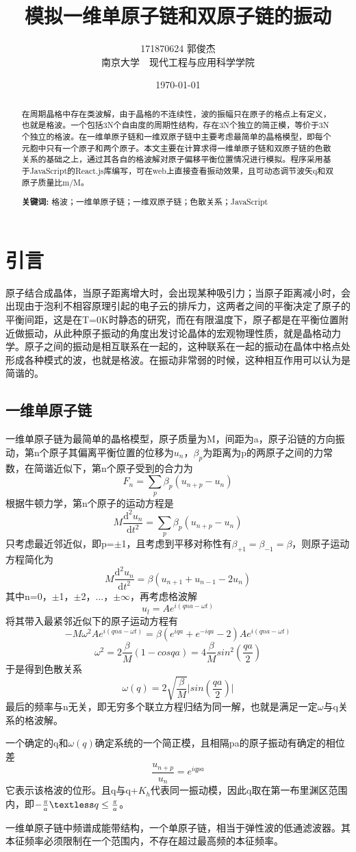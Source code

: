 \documentclass[UTF8]{article}
\title{模拟一维单原子链和双原子链的振动}   %
\author{171870624 郭俊杰\\南京大学$\quad$现代工程与应用科学学院}   %
\date{\today}    %
\begin{document}
\maketitle

\begin{abstract}
在周期晶格中存在类波解，由于晶格的不连续性，波的振幅只在原子的格点上有定义，也就是格波。一个包括3N个自由度的周期性结构，存在3N个独立的简正模，等价于3N个独立的格波。在一维单原子链和一维双原子链中主要考虑最简单的晶格模型，即每个元胞中只有一个原子和两个原子。本文主要在计算求得一维单原子链和双原子链的色散关系的基础之上，通过其各自的格波解对原子偏移平衡位置情况进行模拟。程序采用基于JavaScript的React.js库编写，可在web上直接查看振动效果，且可动态调节波矢q和双原子质量比m/M。 \\
\par\textbf{关键词: } 格波；一维单原子链；一维双原子链；色散关系；JavaScript
\end{abstract}


\section{引言}
原子结合成晶体，当原子距离增大时，会出现某种吸引力；当原子距离减小时，会出现由于泡利不相容原理引起的电子云的排斥力，这两者之间的平衡决定了原子的平衡间距，这是在T=0K时静态的研究，而在有限温度下，原子都是在平衡位置附近做振动，从此种原子振动的角度出发讨论晶体的宏观物理性质，就是晶格动力学。原子之间的振动是相互联系在一起的，这种联系在一起的振动在晶体中格点处形成各种模式的波，也就是格波。在振动非常弱的时候，这种相互作用可以认为是简谐的。

\subsection{一维单原子链}
一维单原子链为最简单的晶格模型，原子质量为M，间距为a，原子沿链的方向振动，第n个原子其偏离平衡位置的位移为$u_n$，$\beta_p$为距离为p的两原子之间的力常数，在简谐近似下，第n个原子受到的合力为$$F_n = \sum_p\beta_p(u_{n+p}-u_n)$$根据牛顿力学，第n个原子的运动方程是$$M\frac{\mathrm{d}^2u_n}{\mathrm{d}t^2}=\sum_p\beta_p(u_{n+p}-u_n)$$只考虑最近邻近似，即p=$\pm$1，且考虑到平移对称性有$\beta_{+1}=\beta_{-1}=\beta$，则原子运动方程简化为$$M\frac{\mathrm{d}^2u_n}{\mathrm{d}t^2}=\beta(u_{n+1}+u_{n-1}-2u_{n})$$其中n=0，$\pm$1，$\pm$2，...，$\pm\infty$，再考虑格波解$$u_l=Ae^{i(qna-\omega t)}$$将其带入最紧邻近似下的原子运动方程有$$-M\omega^2Ae^{i(qna-\omega t)}=\beta(e^{iqa}+e^{-iqa}-2)Ae^{i(qna-\omega t)}$$ $$\omega^2=2\frac{\beta}{M}(1-cosqa)=4\frac{\beta}{M}sin^2(\frac{qa}{2})$$于是得到色散关系$$\omega(q)=2\sqrt{\frac{\beta}{M}}\vert{sin(\frac{qa}{2})}\vert$$最后的频率与n无关，即无穷多个联立方程归结为同一解，也就是满足一定$\omega$与q关系的格波解。
\par
一个确定的q和$\omega(q)$确定系统的一个简正模，且相隔pa的原子振动有确定的相位差$$\frac{u_{n+p}}{u_n}=e^{iqpa}$$它表示该格波的位形。且q与q+$K_h$代表同一振动模，因此q取在第一布里渊区范围内，即$-\frac{\pi}{a} \textless q\leq\frac{\pi}{a}$。
\par
一维单原子链中频谱成能带结构，一个单原子链，相当于弹性波的低通滤波器。其本征频率必须限制在一个范围内，不存在超过最高频的本征频率。
\end{document}
